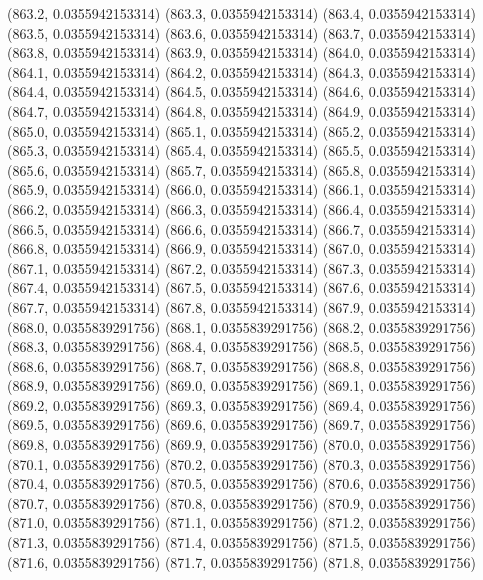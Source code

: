 {					(863.2, 0.0355942153314)
					(863.3, 0.0355942153314)
					(863.4, 0.0355942153314)
					(863.5, 0.0355942153314)
					(863.6, 0.0355942153314)
					(863.7, 0.0355942153314)
					(863.8, 0.0355942153314)
					(863.9, 0.0355942153314)
					(864.0, 0.0355942153314)
					(864.1, 0.0355942153314)
					(864.2, 0.0355942153314)
					(864.3, 0.0355942153314)
					(864.4, 0.0355942153314)
					(864.5, 0.0355942153314)
					(864.6, 0.0355942153314)
					(864.7, 0.0355942153314)
					(864.8, 0.0355942153314)
					(864.9, 0.0355942153314)
					(865.0, 0.0355942153314)
					(865.1, 0.0355942153314)
					(865.2, 0.0355942153314)
					(865.3, 0.0355942153314)
					(865.4, 0.0355942153314)
					(865.5, 0.0355942153314)
					(865.6, 0.0355942153314)
					(865.7, 0.0355942153314)
					(865.8, 0.0355942153314)
					(865.9, 0.0355942153314)
					(866.0, 0.0355942153314)
					(866.1, 0.0355942153314)
					(866.2, 0.0355942153314)
					(866.3, 0.0355942153314)
					(866.4, 0.0355942153314)
					(866.5, 0.0355942153314)
					(866.6, 0.0355942153314)
					(866.7, 0.0355942153314)
					(866.8, 0.0355942153314)
					(866.9, 0.0355942153314)
					(867.0, 0.0355942153314)
					(867.1, 0.0355942153314)
					(867.2, 0.0355942153314)
					(867.3, 0.0355942153314)
					(867.4, 0.0355942153314)
					(867.5, 0.0355942153314)
					(867.6, 0.0355942153314)
					(867.7, 0.0355942153314)
					(867.8, 0.0355942153314)
					(867.9, 0.0355942153314)
					(868.0, 0.0355839291756)
					(868.1, 0.0355839291756)
					(868.2, 0.0355839291756)
					(868.3, 0.0355839291756)
					(868.4, 0.0355839291756)
					(868.5, 0.0355839291756)
					(868.6, 0.0355839291756)
					(868.7, 0.0355839291756)
					(868.8, 0.0355839291756)
					(868.9, 0.0355839291756)
					(869.0, 0.0355839291756)
					(869.1, 0.0355839291756)
					(869.2, 0.0355839291756)
					(869.3, 0.0355839291756)
					(869.4, 0.0355839291756)
					(869.5, 0.0355839291756)
					(869.6, 0.0355839291756)
					(869.7, 0.0355839291756)
					(869.8, 0.0355839291756)
					(869.9, 0.0355839291756)
					(870.0, 0.0355839291756)
					(870.1, 0.0355839291756)
					(870.2, 0.0355839291756)
					(870.3, 0.0355839291756)
					(870.4, 0.0355839291756)
					(870.5, 0.0355839291756)
					(870.6, 0.0355839291756)
					(870.7, 0.0355839291756)
					(870.8, 0.0355839291756)
					(870.9, 0.0355839291756)
					(871.0, 0.0355839291756)
					(871.1, 0.0355839291756)
					(871.2, 0.0355839291756)
					(871.3, 0.0355839291756)
					(871.4, 0.0355839291756)
					(871.5, 0.0355839291756)
					(871.6, 0.0355839291756)
					(871.7, 0.0355839291756)
					(871.8, 0.0355839291756)
}
